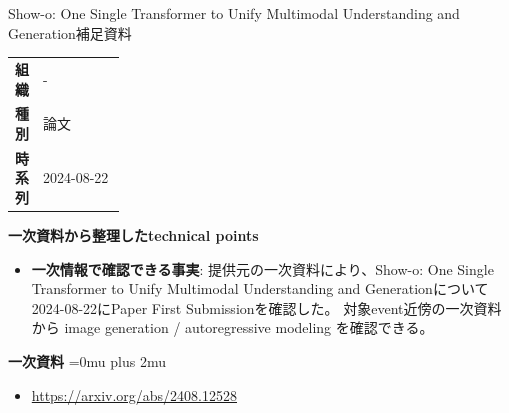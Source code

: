 \begin{technicalnote}{Show-o: One Single Transformer to Unify Multimodal Understanding and Generation}{補足資料}
\begingroup
\begin{tabularx}{\linewidth}{@{}>{\bfseries}p{0.22\linewidth}X@{}}
組織 & - \\
種別 & 論文 \\
時系列 & 2024-08-22 \\
\end{tabularx}
\smallskip
{\bfseries 一次資料から整理したtechnical points}
\begin{itemize}[leftmargin=1.5em,itemsep=0.35em]
\item \textbf{一次情報で確認できる事実}: 提供元の一次資料により、Show-o: One Single Transformer to Unify Multimodal Understanding and Generationについて2024-08-22にPaper First Submissionを確認した。 対象event近傍の一次資料から image generation / autoregressive modeling を確認できる。
\end{itemize}
\begin{minipage}{\linewidth}
\begin{samepage}
{\bfseries 一次資料}
\begingroup\sloppy
\Urlmuskip=0mu plus 2mu\relax
\begin{itemize}[leftmargin=1.5em,itemsep=0.25em]
\item {\scriptsize\url{https://arxiv.org/abs/2408.12528}}
\end{itemize}
\endgroup
\end{samepage}
\end{minipage}
\endgroup
\end{technicalnote}
\medskip

